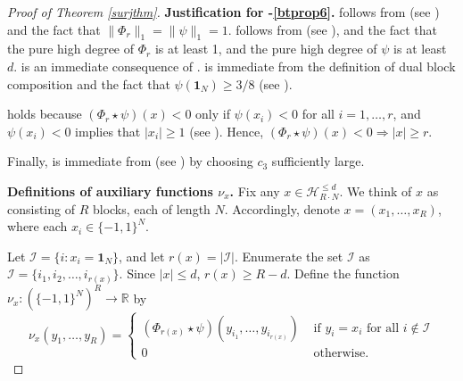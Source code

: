 \documentclass{toc}
\newcommand{\reals}{\mathbb{R}}
\newcommand{\bits}{\{-1,1\}}
\newcommand{\ls}{\star}
\newcommand{\Hcal}{\mathcal{H}}
\begin{document}
\begin{proof}[Proof of Theorem \ref{surjthm}]
\medskip  %
	\noindent \textbf{Justification for -\eqref{btprop6}.}  follows from 
	 (see ) and the fact that $\|\Phi_r\|_1=\|\psi\|_1=1$.
	 follows from  (see ),
	and the fact that the pure high degree of $\Phi_r$ is at least 1, and the pure high degree of 
	$\psi$ is at least $d$.
	 is an immediate consequence of \cite[Theorem 1]{bt14}.
	 is immediate from the definition of dual block composition
	and the fact that $\psi(\mathbf{1}_N) \geq 3/8$ (see ). 
	
	\medskip
	 holds because $\left(\Phi_r \ls \psi\right)(x) < 0$ only if $\psi(x_i) < 0$ for all $i=1, \dots, r$,
	and $\psi(x_i) < 0$ implies that $|x_i| \geq 1$ (see ). Hence,  $\left(\Phi_r \ls \psi\right)(x) < 0 \Longrightarrow |x| \geq r$.
	
	\medskip
	Finally, 
	 is immediate from  (see ) by choosing $c_3$ sufficiently large.
	
	\medskip
	\noindent \textbf{Definitions of auxiliary functions $\nu_x$.}
	Fix any $x \in \Hcal_{R \cdot N}^{\leq d}$. We think of $x$ as consisting of $R$ blocks, each of length $N$. Accordingly,  denote 
	$x=(x_1, \dots, x_{R})$, where each $x_i \in \bits^{N}$. 

	Let $\mathcal{I}=\{i \colon x_i = \mathbf{1}_N\}$, and let $r(x)=|\mathcal{I}|$. Enumerate the set $\mathcal{I}$ as $\mathcal{I} = \{i_1, i_2, \dots, i_{r(x)}\}$.
	Since $|x| \leq d$, $r(x) \geq R-d.$ 
	Define the function $\nu_x \colon \left(\bits^{N}\right)^R \to \reals$ by 
	\[
	\nu_x(y_1, \dots, y_R) = 
	\begin{cases}
	(\Phi_{r(x)} \ls \psi)(y_{i_1}, \dots, y_{i_{r(x)}}) & \text{ if } y_i = x_i \text{ for all } i \notin \mathcal{I}\\
	0 & \text{ otherwise}.
	\end{cases} 
	\]
	

\end{proof}
\end{document}
